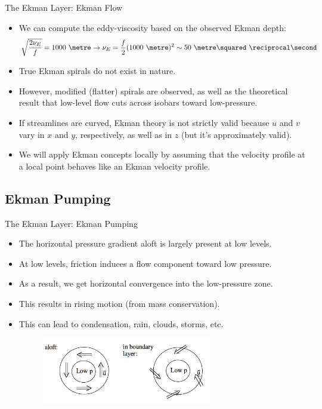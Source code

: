 \begin{frame}{The Ekman Layer: Ekman Flow}

\begin{itemize}
	\item We can compute the eddy-viscosity based on the observed Ekman depth:
	$$\sqrt{\frac{2\nu_E}{f}} = 1000\ \metre \rightarrow \nu_E = \frac{f}{2}(1000\ \metre)^2 \sim 50\ \metre\squared\ \reciprocal\second$$
	\item True Ekman spirals do not exist in nature.
	\item However, modified (flatter) spirals are observed, as well as the theoretical result that low-level flow cuts across isobars toward low-pressure.
	\item If streamlines are curved, Ekman theory is not strictly valid  because $u$ and $v$ vary in $x$ and $y$, respectively, as well as in $z$ (but it's approximately valid).
	\item We will apply Ekman concepts locally by assuming that the velocity profile at a local point behaves like an Ekman velocity profile.
\end{itemize}
\end{frame}
\subsection{Ekman Pumping}
\begin{frame}{The Ekman Layer: Ekman Pumping}

\begin{itemize}
	\item The horizontal pressure gradient aloft is largely present at low levels. 
	\item At low levels, friction induces a flow component toward low pressure. 
	\item As a result, we get horizontal convergence into the low-pressure zone.
	\item This results in rising motion (from mass conservation).
	\item This can lead to condensation, rain, clouds, storms, etc.
	\begin{figure}
	\includegraphics[width=0.7\textwidth]{ekman4}	
	\end{figure}
\end{itemize}
\end{frame}


